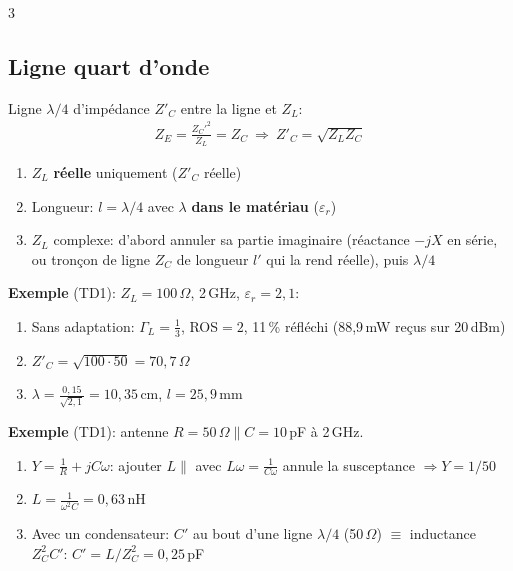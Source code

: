 \documentclass[12pt, a4paper]{article}
\begin{document}
\begin{multicols*}{3}
	\subsection{Ligne quart d'onde}
	Ligne $\lambda/4$ d'impédance $Z'_C$ entre la ligne et $Z_L$:
	\begin{gather*}
		Z_E=\frac{Z_C'^2}{Z_L}=Z_C\ \Rightarrow\ Z'_C=\sqrt{Z_LZ_C}
	\end{gather*}
	\begin{enumerate}[\roman*.]
		\item $Z_L$ \textbf{réelle} uniquement ($Z'_C$ réelle)
		\item Longueur: $l=\lambda/4$ avec $\lambda$ \textbf{dans le matériau} ($\varepsilon_r$)
		\item $Z_L$ complexe: d'abord annuler sa partie imaginaire (réactance $-jX$ en série, ou tronçon de ligne $Z_C$ de longueur $l'$ qui la rend réelle), puis $\lambda/4$
	\end{enumerate}
	\textbf{Exemple} (TD1): $Z_L=100\,\Omega$, 2\,GHz, $\varepsilon_r=2{,}1$:
	\begin{enumerate}[\roman*.]
		\item Sans adaptation: $\Gamma_L=\frac13$, ROS$=2$, 11\,\% réfléchi (88,9\,mW reçus sur 20\,dBm)
		\item $Z'_C=\sqrt{100\cdot50}=70{,}7\,\Omega$
		\item $\lambda=\frac{0{,}15}{\sqrt{2{,}1}}=10{,}35$\,cm, $l=25{,}9$\,mm
	\end{enumerate}

	\colbreak
	\textbf{Exemple} (TD1): antenne $R=50\,\Omega\parallel C=10$\,pF à 2\,GHz.
	\begin{enumerate}[\roman*.]
		\item $Y=\frac1R+jC\omega$: ajouter $L\parallel$ avec $L\omega=\frac1{C\omega}$ annule la susceptance $\Rightarrow Y=1/50$
		\item $L=\frac1{\omega^2C}=0{,}63$\,nH
		\item Avec un condensateur: $C'$ au bout d'une ligne $\lambda/4$ (50\,$\Omega$) $\equiv$ inductance $Z_C^2C'$: $C'=L/Z_C^2=0{,}25$\,pF
	\end{enumerate}


\end{multicols*}
\end{document}
